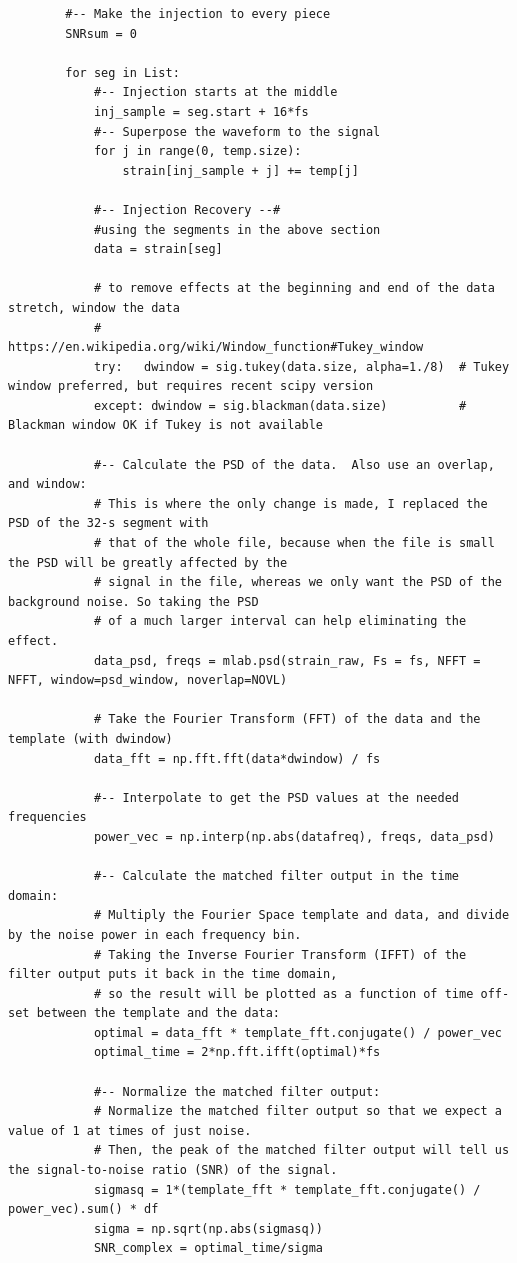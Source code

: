 \documentclass[aps,prd,preprint]{revtex4}
\begin{document}
\begin{lstlisting}
        #-- Make the injection to every piece
        SNRsum = 0
        
        for seg in List:
            #-- Injection starts at the middle
            inj_sample = seg.start + 16*fs
            #-- Superpose the waveform to the signal
            for j in range(0, temp.size):
                strain[inj_sample + j] += temp[j]
                    
            #-- Injection Recovery --#
            #using the segments in the above section
            data = strain[seg]

            # to remove effects at the beginning and end of the data stretch, window the data
            # https://en.wikipedia.org/wiki/Window_function#Tukey_window
            try:   dwindow = sig.tukey(data.size, alpha=1./8)  # Tukey window preferred, but requires recent scipy version 
            except: dwindow = sig.blackman(data.size)          # Blackman window OK if Tukey is not available

            #-- Calculate the PSD of the data.  Also use an overlap, and window:
            # This is where the only change is made, I replaced the PSD of the 32-s segment with
            # that of the whole file, because when the file is small the PSD will be greatly affected by the
            # signal in the file, whereas we only want the PSD of the background noise. So taking the PSD
            # of a much larger interval can help eliminating the effect.
            data_psd, freqs = mlab.psd(strain_raw, Fs = fs, NFFT = NFFT, window=psd_window, noverlap=NOVL)

            # Take the Fourier Transform (FFT) of the data and the template (with dwindow)
            data_fft = np.fft.fft(data*dwindow) / fs

            #-- Interpolate to get the PSD values at the needed frequencies
            power_vec = np.interp(np.abs(datafreq), freqs, data_psd)

            #-- Calculate the matched filter output in the time domain:
            # Multiply the Fourier Space template and data, and divide by the noise power in each frequency bin.
            # Taking the Inverse Fourier Transform (IFFT) of the filter output puts it back in the time domain,
            # so the result will be plotted as a function of time off-set between the template and the data:
            optimal = data_fft * template_fft.conjugate() / power_vec
            optimal_time = 2*np.fft.ifft(optimal)*fs

            #-- Normalize the matched filter output:
            # Normalize the matched filter output so that we expect a value of 1 at times of just noise.
            # Then, the peak of the matched filter output will tell us the signal-to-noise ratio (SNR) of the signal.
            sigmasq = 1*(template_fft * template_fft.conjugate() / power_vec).sum() * df
            sigma = np.sqrt(np.abs(sigmasq))
            SNR_complex = optimal_time/sigma


\end{lstlisting}
\end{document}
